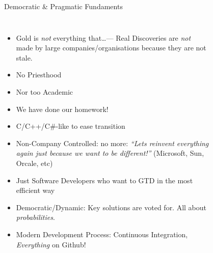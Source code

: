 \documentclass[xcolor=dvipsnames]{beamer}
\begin{document}
\begin{frame}[fragile]{Democratic \& Pragmatic Fundaments}
    \begin{columns}[c] %
      \begin{itemize}[<+->]
      \item Gold is \emph{not} everything that\ldots --- Real Discoveries are
        \emph{not} made by large companies/organisations because they are not
        stale.
      \item No Priesthood
      \item Nor too Academic
      \item We have done our homework!
      \item C/C++/C\#-like to ease transition
      \item Non-Company Controlled: no more: \textit{``Lets reinvent everything again just
        because we want to be different!''} (Microsoft, Sun, Orcale, etc)
      \item Just Software Developers who want to GTD in the most efficient way
      \item Democratic/Dynamic: Key solutions are voted for. All about
        \emph{probabilities}.
      \item Modern Development Process: Continuous Integration, \emph{Everything} on Github!
      \end{itemize}
      \begin{figure}
      \end{figure}
    \end{columns}
\end{frame}
\end{document}
